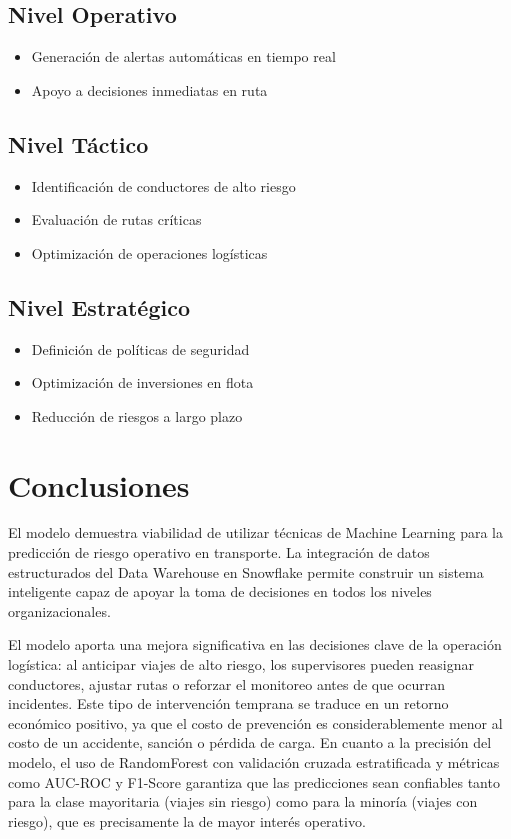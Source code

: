 \documentclass[12pt]{article}
\begin{document}
\subsection{Nivel Operativo}

\begin{itemize}
    \item Generación de alertas automáticas en tiempo real
    \item Apoyo a decisiones inmediatas en ruta
\end{itemize}

\subsection{Nivel Táctico}

\begin{itemize}
    \item Identificación de conductores de alto riesgo
    \item Evaluación de rutas críticas
    \item Optimización de operaciones logísticas
\end{itemize}

\subsection{Nivel Estratégico}

\begin{itemize}
    \item Definición de políticas de seguridad
    \item Optimización de inversiones en flota
    \item Reducción de riesgos a largo plazo
\end{itemize}

\section{Conclusiones}

El modelo demuestra viabilidad de utilizar técnicas de Machine Learning para la predicción de riesgo operativo en transporte. La integración de datos estructurados del Data Warehouse en Snowflake permite construir un sistema inteligente capaz de apoyar la toma de decisiones en todos los niveles organizacionales.

El modelo aporta una mejora significativa en las decisiones clave de la operación logística: al anticipar viajes de alto riesgo, los supervisores pueden reasignar conductores, ajustar rutas o reforzar el monitoreo antes de que ocurran incidentes. Este tipo de intervención temprana se traduce en un retorno económico positivo, ya que el costo de prevención es considerablemente menor al costo de un accidente, sanción o pérdida de carga. En cuanto a la precisión del modelo, el uso de RandomForest con validación cruzada estratificada y métricas como AUC-ROC y F1-Score garantiza que las predicciones sean confiables tanto para la clase mayoritaria (viajes sin riesgo) como para la minoría (viajes con riesgo), que es precisamente la de mayor interés operativo.
\end{document}
